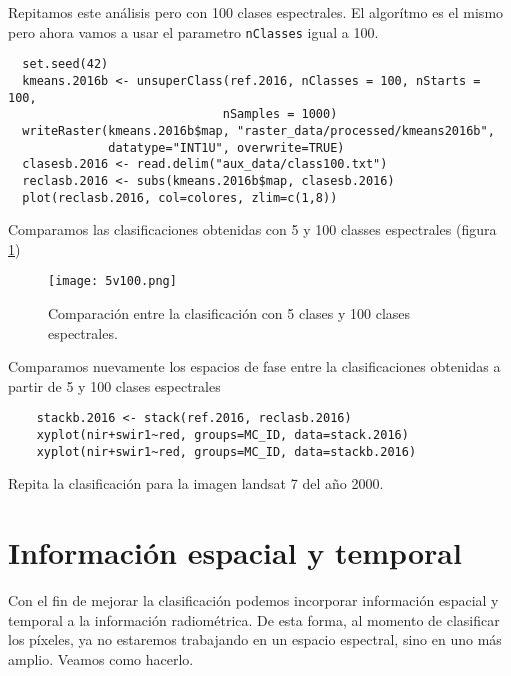 \begin{exa}
  Repitamos este an\'alisis pero con 100 clases espectrales. El algor\'itmo es el mismo pero ahora vamos a usar el parametro \texttt{nClasses} igual a 100.

  \begin{lstlisting}
  set.seed(42)
  kmeans.2016b <- unsuperClass(ref.2016, nClasses = 100, nStarts = 100,
                              nSamples = 1000)
  writeRaster(kmeans.2016b$map, "raster_data/processed/kmeans2016b",
              datatype="INT1U", overwrite=TRUE)
  clasesb.2016 <- read.delim("aux_data/class100.txt")
  reclasb.2016 <- subs(kmeans.2016b$map, clasesb.2016)
  plot(reclasb.2016, col=colores, zlim=c(1,8))
  \end{lstlisting}

  Comparamos las clasificaciones obtenidas con 5 y 100 classes espectrales (figura \ref{fig:5v100})

  \begin{figure}[h!]
    \centering
    \texttt{[image: 5v100.png]}
    \caption{Comparaci\'on entre la clasificaci\'on con 5 clases y 100 clases espectrales.}
    \label{fig:5v100}
  \end{figure}

  Comparamos nuevamente los espacios de fase entre la clasificaciones obtenidas a partir de 5 y 100 clases espectrales

  \begin{lstlisting}
    stackb.2016 <- stack(ref.2016, reclasb.2016)
    xyplot(nir+swir1~red, groups=MC_ID, data=stack.2016)
    xyplot(nir+swir1~red, groups=MC_ID, data=stackb.2016)
  \end{lstlisting}

\end{exa}

\begin{act}
  Repita la clasificaci\'on para la imagen landsat 7 del año 2000.
\end{act}


\section{Informaci\'on espacial y temporal}

Con el fin de mejorar la clasificaci\'on podemos incorporar informaci\'on espacial y temporal a la informaci\'on radiom\'etrica. De esta forma, al momento de clasificar los p\'ixeles, ya no estaremos trabajando en un espacio espectral, sino en uno m\'as amplio. Veamos como hacerlo.

